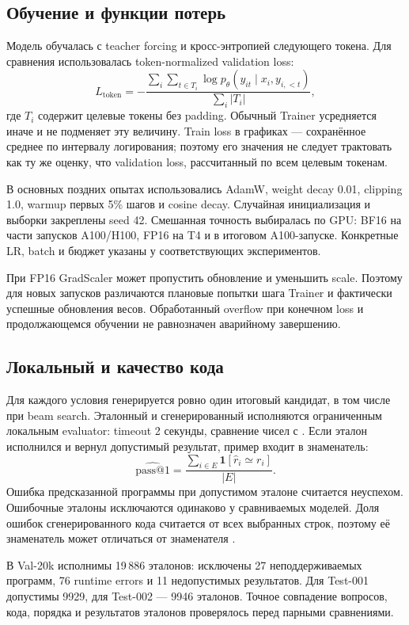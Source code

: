 \subsection{Обучение и функции потерь}
Модель обучалась с teacher forcing и кросс-энтропией следующего токена.
Для сравнения использовалась token-normalized validation loss:
\[
 L_{\mathrm{token}}=
 -\frac{\sum_{i}\sum_{t\in T_i}\log p_\theta(y_{it}\mid x_i,y_{i,<t})}
 {\sum_i |T_i|},
\]
где $T_i$ содержит целевые токены без padding. Обычный 
Trainer усредняется иначе и не подменяет эту величину.
Train loss в графиках --- сохранённое среднее по интервалу логирования;
поэтому его значения не следует трактовать как ту же оценку, что
validation loss, рассчитанный по всем целевым токенам.

В основных поздних опытах использовались AdamW, weight decay 0.01,
clipping 1.0, warmup первых 5\% шагов и cosine decay.
Случайная инициализация и выборки закреплены seed 42.
Смешанная точность выбиралась по GPU: BF16 на части запусков A100/H100,
FP16 на T4 и в итоговом A100-запуске. Конкретные LR, batch и бюджет
указаны у соответствующих экспериментов.

При FP16 GradScaler может пропустить обновление и уменьшить scale.
Поэтому для новых запусков различаются плановые попытки шага Trainer
и фактически успешные обновления весов. Обработанный overflow при конечном
loss и продолжающемся обучении не равнозначен аварийному завершению.

\subsection{Локальный \pass{} и качество кода}
Для каждого условия генерируется ровно один итоговый кандидат,
в том числе при beam search. Эталонный и сгенерированный
 исполняются ограниченным локальным evaluator:
timeout 2 секунды, сравнение чисел с .
Если эталон исполнился и вернул допустимый результат, пример входит
в знаменатель:
\[
 \widehat{\mathrm{pass@1}}=
 \frac{\sum_{i\in E}\mathbf{1}[\widehat{r}_i\simeq r_i]}{|E|}.
\]
Ошибка предсказанной программы при допустимом эталоне считается неуспехом.
Ошибочные эталоны исключаются одинаково у сравниваемых моделей.
Доля ошибок сгенерированного кода считается от всех выбранных строк,
поэтому её знаменатель может отличаться от знаменателя \pass{}.

В Val-20k исполнимы 19\,886 эталонов: исключены 27 неподдерживаемых
программ, 76 runtime errors и 11 недопустимых результатов.
Для Test-001 допустимы 9929, для Test-002 --- 9946 эталонов.
Точное совпадение вопросов, кода, порядка и результатов эталонов
проверялось перед парными сравнениями.

